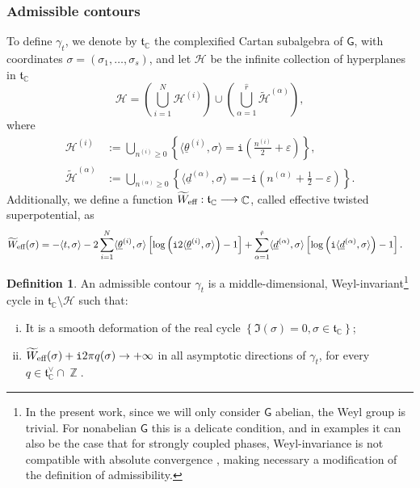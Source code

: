 \documentclass[12pt,a4paper,oneside]{amsart}
\numberwithin{equation}{section}
\theoremstyle{definition}
\newtheorem{defin}[thm]{Definition}
\theoremstyle{remark}
\DeclareMathOperator{\C}{\mathbb{C}}
\DeclareMathOperator{\Z}{\mathbb{Z}}
\newcommand{\sG}{\mathsf{G}}
\newcommand{\ii}{\mathtt{i}}
\begin{document}
\subsubsection{Admissible contours}
To define $\gamma_t$, we denote by $\mathfrak{t}_{\C}$ the complexified Cartan subalgebra of $\sG$, with coordinates $\sigma =(\sigma_1, \dots, \sigma_s)$, and let $\mathcal{H}$ be the infinite collection of hyperplanes in $\mathfrak{t}_{\mathbb{C}}$
\begin{equation*}
    \mathcal{H} = \left( \bigcup_{i=1}^{N} \mathcal{H}^{(i)} \right) \cup \left( \bigcup_{\alpha=1}^{\hat{r}}  \tilde{\mathcal{H}}^{(\alpha)} \right) , 
\end{equation*}
where
\begin{equation*}
\begin{aligned}
    \mathcal{H}^{(i)} & := \bigcup_{n^{(i)} \ge 0} \left\{ \langle \underline{\theta}^{(i)}, \sigma \rangle =\ii \left( \frac{n^{(i)}}{2} +\varepsilon\right) \right\} , \\
    \tilde{\mathcal{H}}^{(\alpha)} & :=\bigcup_{n^{(\alpha)} \ge 0} \left\{ \langle \underline{d}^{(\alpha)}, \sigma \rangle = -\ii \left( n^{(\alpha)} + \frac{1}{2}-\varepsilon\right) \right\} .
\end{aligned}
\end{equation*}
Additionally, we define a function $\widetilde{W}_{\text{\rm eff}} : \mathfrak{t}_{\C} \longrightarrow \C $, called effective twisted superpotential, as
\begin{equation*}
\begin{aligned}
	\widetilde{W}_{\text{\rm eff}} (\sigma) = - \langle t, \sigma\rangle  - 2 & \sum_{i=1}^{N} \langle \underline{\theta}^{(i)}, \sigma \rangle \left[ \log \left( \ii 2 \langle \underline{\theta}^{(i)}, \sigma \rangle  \right) -1 \right]  + \sum_{\alpha=1}^{\hat{r}} \langle \underline{d}^{(\alpha)}, \sigma \rangle \left[ \log \left( \ii \langle \underline{d}^{(\alpha)}, \sigma \rangle  \right) -1 \right] .
\end{aligned}
\end{equation*}
\begin{defin}\label{def:gammat}
An admissible contour $\gamma_t$ is a middle-dimensional, Weyl-invariant\footnote{In the present work, since we will only consider $\sG$ abelian, the Weyl group is trivial. For nonabelian $\sG$ this is a delicate condition, and in examples it can also be the case that for strongly coupled phases, Weyl-invariance is not compatible with absolute convergence \cite{EHKR}, making necessary a modification of the definition of admissibility.} cycle in $\mathfrak{t}_{\C} \setminus \mathcal{H} $ such that:
\begin{enumerate}[(i)]
	\item It is a smooth deformation of the real cycle $\left\{ \Im (\sigma)=0, \sigma \in \mathfrak{t}_{\C} \right\}$;
	\item $\widetilde{W}_{\text{\rm eff}} (\sigma) + \ii 2 \pi q (\sigma) \to + \infty$ in all asymptotic directions of $\gamma_t$, for every $q \in \mathfrak{t}^{\vee}_{\C} \cap \Z$.
\end{enumerate}
\end{defin}
\end{document}
